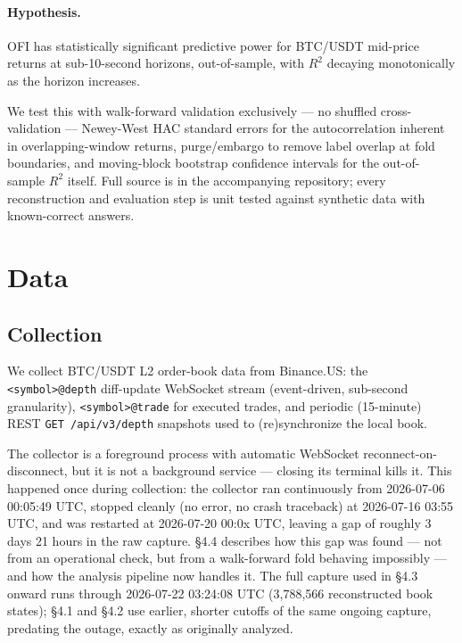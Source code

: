 \documentclass[11pt]{article}
\begin{document}
\paragraph{Hypothesis.} OFI has statistically significant predictive power for BTC/USDT mid-price returns at sub-10-second horizons, out-of-sample, with $R^2$ decaying monotonically as the horizon increases.

We test this with walk-forward validation exclusively --- no shuffled cross-validation --- Newey-West HAC standard errors for the autocorrelation inherent in overlapping-window returns, purge/embargo to remove label overlap at fold boundaries, and moving-block bootstrap confidence intervals for the out-of-sample $R^2$ itself. Full source is in the accompanying repository; every reconstruction and evaluation step is unit tested against synthetic data with known-correct answers.

\section{Data}

\subsection{Collection}

We collect BTC/USDT L2 order-book data from Binance.US: the \texttt{<symbol>@depth} diff-update WebSocket stream (event-driven, sub-second granularity), \texttt{<symbol>@trade} for executed trades, and periodic (15-minute) REST \texttt{GET /api/v3/depth} snapshots used to (re)synchronize the local book.

The collector is a foreground process with automatic WebSocket reconnect-on-disconnect, but it is not a background service --- closing its terminal kills it. This happened once during collection: the collector ran continuously from 2026-07-06 00:05:49 UTC, stopped cleanly (no error, no crash traceback) at 2026-07-16 03:55 UTC, and was restarted at 2026-07-20 00:0x UTC, leaving a gap of roughly 3 days 21 hours in the raw capture. \S4.4 describes how this gap was found --- not from an operational check, but from a walk-forward fold behaving impossibly --- and how the analysis pipeline now handles it. The full capture used in \S4.3 onward runs through 2026-07-22 03:24:08 UTC (3{,}788{,}566 reconstructed book states); \S4.1 and \S4.2 use earlier, shorter cutoffs of the same ongoing capture, predating the outage, exactly as originally analyzed.
\end{document}
